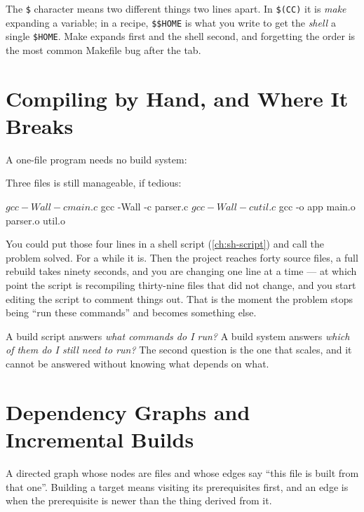 \begin{note}
	The \texttt{\$} character means two different things two lines apart. In
	\texttt{\$(CC)} it is \emph{make} expanding a variable; in a recipe,
	\texttt{\$\$HOME} is what you write to get the \emph{shell} a single
	\texttt{\$HOME}. Make expands first and the shell second, and forgetting the
	order is the most common Makefile bug after the tab.
\end{note}

\section{Compiling by Hand, and Where It Breaks}\label{sec:mk-byhand}

A one-file program needs no build system:


Three files is still manageable, if tedious:

\begin{shell}
$ gcc -Wall -c main.c
$ gcc -Wall -c parser.c
$ gcc -Wall -c util.c
$ gcc -o app main.o parser.o util.o
\end{shell}

You could put those four lines in a shell script (\autoref{ch:sh-script}) and
call the problem solved. For a while it is. Then the project reaches forty
source files, a full rebuild takes ninety seconds, and you are changing one
line at a time --- at which point the script is recompiling thirty-nine files
that did not change, and you start editing the script to comment things out.
That is the moment the problem stops being ``run these commands'' and becomes
something else.

\begin{intuition}
	A build script answers \emph{what commands do I run?} A build system answers
	\emph{which of them do I still need to run?} The second question is the one
	that scales, and it cannot be answered without knowing what depends on what.
\end{intuition}

\section{Dependency Graphs and Incremental Builds}\label{sec:mk-graph}

\begin{definition}
	A directed graph whose nodes are files and whose edges say ``this file is built
	from that one''. Building a target means visiting its prerequisites first, and
	an edge is  when the prerequisite is newer than the thing derived
	from it.
\end{definition}

